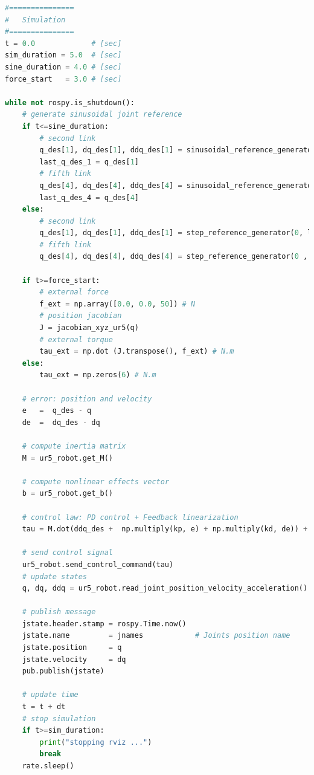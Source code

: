 \begin{lstlisting}[language=Python,caption={Move the second and fifth joint of UR5 robot with the required movement of activity 2.4.}, label={lst:inverse_dynamics_external_force}]
#===============
#   Simulation
#===============
t = 0.0             # [sec] 
sim_duration = 5.0  # [sec]
sine_duration = 4.0 # [sec]
force_start   = 3.0 # [sec]

while not rospy.is_shutdown():
    # generate sinusoidal joint reference
    if t<=sine_duration:
        # second link
        q_des[1], dq_des[1], ddq_des[1] = sinusoidal_reference_generator(q0[1], 0.2, 1, t)
        last_q_des_1 = q_des[1]
        # fifth link
        q_des[4], dq_des[4], ddq_des[4] = sinusoidal_reference_generator(q0[4], 0.4, 1.5, t)  
        last_q_des_4 = q_des[4]  
    else:
        # second link
        q_des[1], dq_des[1], ddq_des[1] = step_reference_generator(0, last_q_des_1)
        # fifth link
        q_des[4], dq_des[4], ddq_des[4] = step_reference_generator(0 , last_q_des_4)

    if t>=force_start:
        # external force
        f_ext = np.array([0.0, 0.0, 50]) # N
        # position jacobian
        J = jacobian_xyz_ur5(q)
        # external torque 
        tau_ext = np.dot (J.transpose(), f_ext) # N.m
    else:
        tau_ext = np.zeros(6) # N.m
    
    # error: position and velocity
    e 	=  q_des - q
    de 	=  dq_des - dq    

    # compute inertia matrix
    M = ur5_robot.get_M()

    # compute nonlinear effects vector
    b = ur5_robot.get_b()   

    # control law: PD control + Feedback linearization
    tau = M.dot(ddq_des +  np.multiply(kp, e) + np.multiply(kd, de)) + b + tau_ext
    
    # send control signal   
    ur5_robot.send_control_command(tau)
    # update states
    q, dq, ddq = ur5_robot.read_joint_position_velocity_acceleration()

    # publish message
    jstate.header.stamp = rospy.Time.now()
    jstate.name 		= jnames			# Joints position name
    jstate.position 	= q
    jstate.velocity 	= dq
    pub.publish(jstate)

    # update time
    t = t + dt  
	# stop simulation
    if t>=sim_duration:
        print("stopping rviz ...")
        break
    rate.sleep()
\end{lstlisting}

